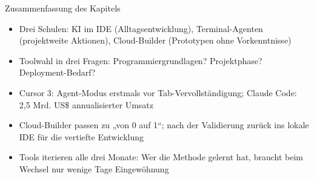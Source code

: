 \begin{tcbsummary}{Zusammenfassung des Kapitels}
\begin{itemize}
  \item Drei Schulen: KI im IDE (Alltagsentwicklung), Terminal-Agenten (projektweite Aktionen), Cloud-Builder (Prototypen ohne Vorkenntnisse)
  \item Toolwahl in drei Fragen: Programmiergrundlagen? Projektphase? Deployment-Bedarf?
  \item Cursor 3: Agent-Modus erstmals vor Tab-Vervollständigung; Claude Code: 2,5 Mrd. US\$ annualisierter Umsatz
  \item Cloud-Builder passen zu „von 0 auf 1“; nach der Validierung zurück ins lokale IDE für die vertiefte Entwicklung
  \item Tools iterieren alle drei Monate: Wer die Methode gelernt hat, braucht beim Wechsel nur wenige Tage Eingewöhnung
\end{itemize}

\end{tcbsummary}
